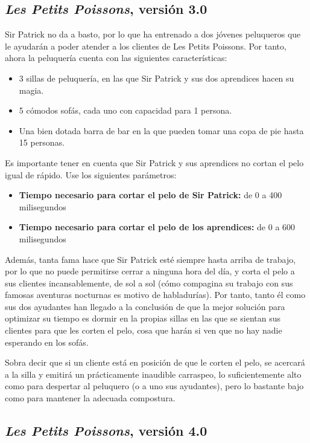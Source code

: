 \documentclass[a4paper]{article}
\begin{document}
\subsection{\textit{Les Petits Poissons}, versión 3.0}

Sir Patrick no da a basto, por lo que ha entrenado a dos jóvenes peluqueros que le ayudarán a poder atender a los clientes de Les Petits Poissons. Por tanto, ahora la peluquería cuenta con las siguientes características:

\begin{itemize}
    \item 3 sillas de peluquería, en las que Sir Patrick y sus dos aprendices hacen su magia.
    \item 5 cómodos sofás, cada uno con capacidad para 1 persona.
    \item Una bien dotada barra de bar en la que pueden tomar una copa de pie hasta 15 personas.
\end{itemize}

Es importante tener en cuenta que Sir Patrick y sus aprendices no cortan el pelo igual de rápido. Use los siguientes parámetros:

\begin{itemize}
    \item \textbf{Tiempo necesario para cortar el pelo de Sir Patrick:} de 0 a 400 milisegundos
    \item \textbf{Tiempo necesario para cortar el pelo de los aprendices:} de 0 a 600 milisegundos
\end{itemize}

Además, tanta fama hace que Sir Patrick esté siempre hasta arriba de trabajo, por lo que no puede permitirse cerrar a ninguna hora del día, y corta el pelo a sus clientes incansablemente, de sol a sol (cómo compagina su trabajo con sus famosas aventuras nocturnas es motivo de habladurías). Por tanto, tanto él como sus dos ayudantes han llegado a la conclusión de que la mejor solución para optimizar su tiempo es dormir en la propias sillas en las que se sientan sus clientes para que les corten el pelo, cosa que harán si ven que no hay nadie esperando en los sofás.

Sobra decir que si un cliente está en posición de que le corten el pelo, se acercará a la silla y emitirá un prácticamente inaudible carraspeo, lo suficientemente alto como para despertar al peluquero (o a uno sus ayudantes), pero lo bastante bajo como para mantener la adecuada compostura.

\subsection{\textit{Les Petits Poissons}, versión 4.0}
\end{document}
